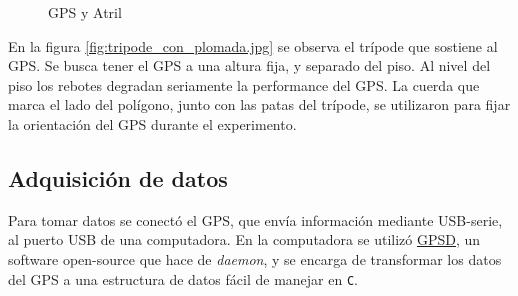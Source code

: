 \documentclass[main]{subfiles}
\begin{document}
\begin{figure}
  \vspace{-30pt}
  \centering
\vspace{-10pt}
  \caption{GPS y Atril}
  \label{fig:rebotes}
  \vspace{-20pt}
\end{figure}

En la figura \ref{fig:tripode_con_plomada.jpg} se observa el trípode que sostiene al GPS. Se busca tener el GPS a una altura fija, y separado del piso. Al nivel del piso los rebotes degradan seriamente la performance del GPS. La cuerda que marca el lado del polígono, junto con las patas del trípode, se utilizaron para fijar la orientación del GPS durante el experimento.

\subsection{Adquisición de datos}
\label{sec:adquisicion-de-datos}

Para tomar datos se conectó el GPS, que env\'ia información mediante USB-serie, al puerto USB de una computadora. En la computadora se utilizó \href{http://catb.org/gpsd/}{GPSD}, un software open-source que hace de \textit{daemon}, y se encarga de transformar los datos del GPS a una estructura de datos fácil de manejar en \verb+C+.
\end{document}
